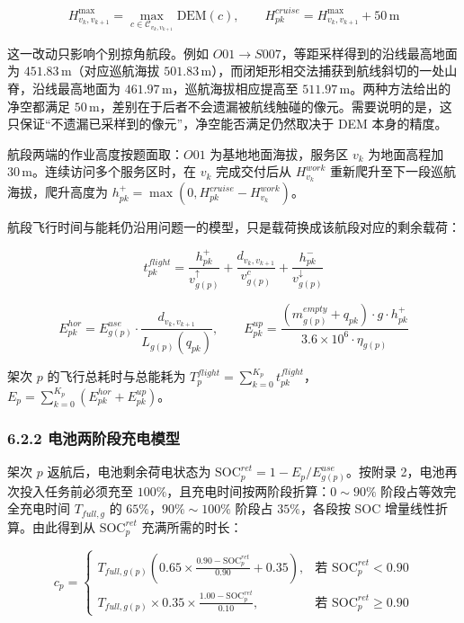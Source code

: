 \documentclass[withoutpreface,bwprint]{format}
\begin{document}
\begin{equation}
H_{v_k, v_{k+1}}^{\max} = \max_{c \in \mathcal{C}_{v_k, v_{k+1}}} \text{DEM}(c), \qquad H_{pk}^{cruise} = H_{v_k, v_{k+1}}^{\max} + 50\,\text{m}
\end{equation}

这一改动只影响个别掠角航段。例如 $O01 \to S007$，等距采样得到的沿线最高地面为 $451.83\,\text{m}$（对应巡航海拔 $501.83\,\text{m}$），而闭矩形相交法捕获到航线斜切的一处山脊，沿线最高地面为 $461.97\,\text{m}$，巡航海拔相应提高至 $511.97\,\text{m}$。两种方法给出的净空都满足 $50\,\text{m}$，差别在于后者不会遗漏被航线触碰的像元。需要说明的是，这只保证“不遗漏已采样到的像元”，净空能否满足仍然取决于 DEM 本身的精度。

航段两端的作业高度按题面取：$O01$ 为基地地面海拔，服务区 $v_k$ 为地面高程加 $30\,\text{m}$。连续访问多个服务区时，在 $v_k$ 完成交付后从 $H_{v_k}^{work}$ 重新爬升至下一段巡航海拔，爬升高度为 $h_{pk}^+ = \max(0, H_{pk}^{cruise} - H_{v_k}^{work})$。

航段飞行时间与能耗仍沿用问题一的模型，只是载荷换成该航段对应的剩余载荷：

\begin{equation}
t_{pk}^{flight} = \frac{h_{pk}^+}{v_{g(p)}^\uparrow} + \frac{d_{v_k, v_{k+1}}}{v_{g(p)}^c} + \frac{h_{pk}^-}{v_{g(p)}^\downarrow}
\end{equation}

\begin{equation}
E_{pk}^{hor} = E_{g(p)}^{use} \cdot \frac{d_{v_k, v_{k+1}}}{L_{g(p)}(q_{pk})}, \qquad E_{pk}^{up} = \frac{(m_{g(p)}^{empty} + q_{pk}) \cdot g \cdot h_{pk}^+}{3.6 \times 10^6 \cdot \eta_{g(p)}}
\end{equation}

架次 $p$ 的飞行总耗时与总能耗为 $T_p^{flight} = \sum_{k=0}^{K_p} t_{pk}^{flight}$，$E_p = \sum_{k=0}^{K_p} (E_{pk}^{hor} + E_{pk}^{up})$。

\subsubsection{6.2.2 电池两阶段充电模型}
架次 $p$ 返航后，电池剩余荷电状态为 $\text{SOC}_p^{ret} = 1 - E_p / E_{g(p)}^{use}$。按附录 2，电池再次投入任务前必须充至 $100\%$，且充电时间按两阶段折算：$0\sim90\%$ 阶段占等效完全充电时间 $T_{full,g}$ 的 $65\%$，$90\%\sim100\%$ 阶段占 $35\%$，各段按 SOC 增量线性折算。由此得到从 $\text{SOC}_p^{ret}$ 充满所需的时长：

\begin{equation}
c_p = \begin{cases}
T_{full, g(p)} \left( 0.65 \times \frac{0.90 - \text{SOC}_p^{ret}}{0.90} + 0.35 \right), & \text{若 } \text{SOC}_p^{ret} < 0.90 \\[0.4em]
T_{full, g(p)} \times 0.35 \times \frac{1.00 - \text{SOC}_p^{ret}}{0.10}, & \text{若 } \text{SOC}_p^{ret} \ge 0.90
\end{cases}
\label{eq:charge_model}
\end{equation}
\end{document}
